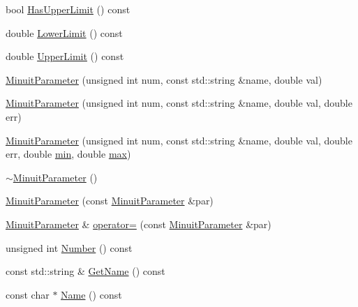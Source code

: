 \begin{DoxyCompactItemize}
\item 
bool \mbox{\hyperlink{classROOT_1_1Minuit2_1_1MinuitParameter_a821e242fbbf23461e3b66a59126f3f02}{Has\+Upper\+Limit}} () const
\item 
double \mbox{\hyperlink{classROOT_1_1Minuit2_1_1MinuitParameter_a25c7f30fc42264f1df96a3852d2e11a4}{Lower\+Limit}} () const
\item 
double \mbox{\hyperlink{classROOT_1_1Minuit2_1_1MinuitParameter_a285e254a9574807222d2a74bb05e18d9}{Upper\+Limit}} () const
\item 
\mbox{\hyperlink{classROOT_1_1Minuit2_1_1MinuitParameter_afa9a57b4990491316502a21e09b756bc}{Minuit\+Parameter}} (unsigned int num, const std\+::string \&name, double val)
\item 
\mbox{\hyperlink{classROOT_1_1Minuit2_1_1MinuitParameter_a56d290ba2abc3c599cff99187329a91a}{Minuit\+Parameter}} (unsigned int num, const std\+::string \&name, double val, double err)
\item 
\mbox{\hyperlink{classROOT_1_1Minuit2_1_1MinuitParameter_a13b433906347405bf85ef2bdf5803990}{Minuit\+Parameter}} (unsigned int num, const std\+::string \&name, double val, double err, double \mbox{\hyperlink{SU3__internal_8h_ab0f5fed3171eb00d1c5f037d9f518a23}{min}}, double \mbox{\hyperlink{SU3__internal_8h_ace7f45ceb252a2dfbf29b98bc81cb8ba}{max}})
\item 
\mbox{\hyperlink{classROOT_1_1Minuit2_1_1MinuitParameter_a487d895f06a46c8c2e1e3dbc97dd0a26}{$\sim$\+Minuit\+Parameter}} ()
\item 
\mbox{\hyperlink{classROOT_1_1Minuit2_1_1MinuitParameter_a0ac95809b18c619597764fcfabcb70fe}{Minuit\+Parameter}} (const \mbox{\hyperlink{classROOT_1_1Minuit2_1_1MinuitParameter}{Minuit\+Parameter}} \&par)
\item 
\mbox{\hyperlink{classROOT_1_1Minuit2_1_1MinuitParameter}{Minuit\+Parameter}} \& \mbox{\hyperlink{classROOT_1_1Minuit2_1_1MinuitParameter_ae26eba9113194d198e988d7c87057398}{operator=}} (const \mbox{\hyperlink{classROOT_1_1Minuit2_1_1MinuitParameter}{Minuit\+Parameter}} \&par)
\item 
unsigned int \mbox{\hyperlink{classROOT_1_1Minuit2_1_1MinuitParameter_aaa2361c2954576d90a0dffcf2e049eea}{Number}} () const
\item 
const std\+::string \& \mbox{\hyperlink{classROOT_1_1Minuit2_1_1MinuitParameter_adc67abcb32783aed362068ee38cb24b7}{Get\+Name}} () const
\item 
const char $\ast$ \mbox{\hyperlink{classROOT_1_1Minuit2_1_1MinuitParameter_a151958b5dbcc194a090753e0b2605fbc}{Name}} () const

\end{DoxyCompactItemize}
